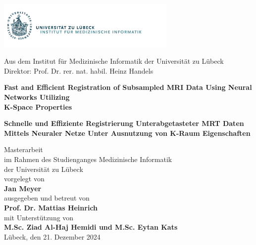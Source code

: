 
\addtolength{\topmargin}{-1.2cm} 
\addtolength{\textwidth}{2.35cm} 

\vspace*{-2.7cm}
\hspace*{-2cm}
\includegraphics[width=0.65\textwidth]{./images/Logo_IMI}
\vspace*{0.4cm}
\begin{center}


\enlargethispage{5cm}
Aus dem Institut für Medizinische Informatik 
der Universität zu Lübeck\\
Direktor: Prof. Dr. rer. nat. habil. Heinz Handels\\[1.8cm]

\begin{Large}
\textcolor{Ocean}{{\textbf{Fast and Efficient Registration of Subsampled MRI Data Using Neural Networks Utilizing\\K-Space Properties} }}\\ 
\end{Large}
\vspace*{1.5cm}
\begin{large}
{{\textbf{Schnelle und Effiziente Registrierung Unterabgetasteter MRT Daten Mittels Neuraler Netze Unter Ausnutzung von K-Raum Eigenschaften} }}\\ 
\end{large}
\vspace*{2.5cm}
%
Masterarbeit\\ 
im Rahmen des Studienganges Medizinische Informatik\\
der Universität zu Lübeck\\[1.0cm]
%
vorgelegt von\\[0.1cm]
\textbf{Jan Meyer}\\[1.0cm]
%
ausgegeben und betreut von\\[0.1cm]
\textbf{Prof. Dr. Mattias Heinrich}\\[0.3cm]
mit Unterstützung von\\[0.1cm]
\textbf{M.Sc. Ziad Al-Haj Hemidi und M.Sc. Eytan Kats}\\[2.8cm]
%
Lübeck, den 21. Dezember 2024
\end{center}
  
